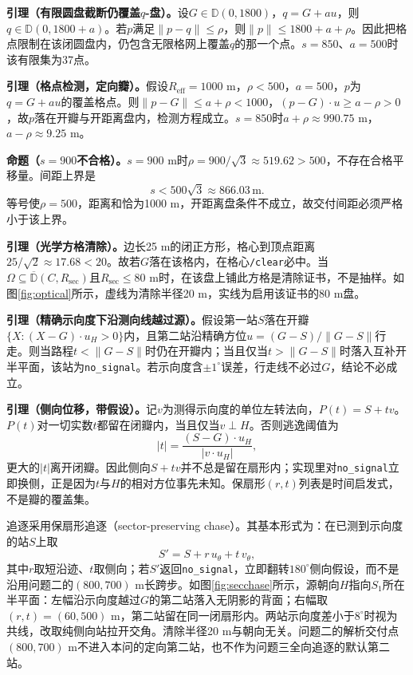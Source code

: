 \documentclass{cumcmthesis}
\begin{document}
\textbf{引理（有限圆盘截断仍覆盖$q$-盘）。}设$G\in\mathbb{D}(0,1800)$，$q=G+au$，则$q\in\mathbb{D}(0,1800+a)$。若$p$满足$\|p-q\|\le\rho$，则$\|p\|\le 1800+a+\rho$。因此把格点限制在该闭圆盘内，仍包含无限格网上覆盖$q$的那一个点。$s=850$、$a=500$时该有限集为37点。

\textbf{引理（格点检测，定向瓣）。}假设$R_{\mathrm{eff}}=1000$ m，$\rho<500$，$a=500$，$p$为$q=G+au$的覆盖格点。则$\|p-G\|\le a+\rho<1000$，$(p-G)\cdot u\ge a-\rho>0$，故$p$落在开瓣与开距离盘内，检测方程成立。$s=850$时$a+\rho\approx 990.75$ m，$a-\rho\approx 9.25$ m。

\textbf{命题（$s=900$不合格）。}$s=900$ m时$\rho=900/\sqrt{3}\approx 519.62>500$，不存在合格平移量。间距上界是
\begin{equation}
s<500\sqrt{3}\approx 866.03\,\mathrm{m}.
\label{eq:smax}
\end{equation}
等号使$\rho=500$，距离和恰为1000 m，开距离盘条件不成立，故交付间距必须严格小于该上界。

\textbf{引理（光学方格清除）。}边长25 m的闭正方形，格心到顶点距离$25/\sqrt{2}\approx 17.68<20$。故若$G$落在该格内，在格心\texttt{/clear}必中。当$\Omega\subseteq\overline{\mathbb{D}}(C,R_{\mathrm{sec}})$且$R_{\mathrm{sec}}\le 80$ m时，在该盘上铺此方格是清除证书，不是抽样。如图\ref{fig:optical}所示，虚线为清除半径20 m，实线为启用该证书的80 m盘。

\textbf{引理（精确示向度下沿测向线越过源）。}假设第一站$S$落在开瓣$\{X:(X-G)\cdot u_H>0\}$内，且第二站沿精确方位$u=(G-S)/\|G-S\|$行走。则当路程$t<\|G-S\|$时仍在开瓣内；当且仅当$t>\|G-S\|$时落入互补开半平面，该站为\texttt{no\_signal}。若示向度含$\pm 1^\circ$误差，行走线不必过$G$，结论不必成立。

\textbf{引理（侧向位移，带假设）。}记$v$为测得示向度的单位左转法向，$P(t)=S+tv$。$P(t)$对一切实数$t$都留在闭瓣内，当且仅当$v\perp H$。否则逃逸阈值为
\[
|t|=\frac{(S-G)\cdot u_H}{|v\cdot u_H|},
\]
更大的$|t|$离开闭瓣。因此侧向$S+tv$并不总是留在扇形内；实现里对\texttt{no\_signal}立即换侧，正是因为$t$与$H$的相对方位事先未知。保扇形$(r,t)$列表是时间启发式，不是瓣的覆盖集。

追逐采用保扇形追逐（sector-preserving chase）。其基本形式为：在已测到示向度的站$S$上取
\[
S'=S+r\,u_{\theta}+t\,v_{\theta},
\]
其中$r$取短沿迹、$t$取侧向；若$S'$返回\texttt{no\_signal}，立即翻转$180^\circ$侧向假设，而不是沿用问题二的$(800,700)$ m长跨步。如图\ref{fig:secchase}所示，源朝向$H$指向$S_1$所在半平面：左幅沿示向度越过$G$的第二站落入无阴影的背面；右幅取$(r,t)=(60,500)$ m，第二站留在同一闭扇形内。两站示向度差小于$8^\circ$时视为共线，改取纯侧向站拉开交角。清除半径20 m与朝向无关。问题二的解析交付点$(800,700)$ m不进入本问的定向第二站，也不作为问题三全向追逐的默认第二站。
\end{document}
